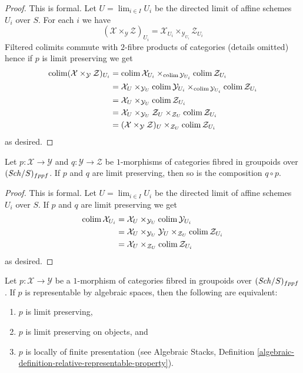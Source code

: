 \begin{proof}
This is formal. Let $U = \lim_{i \in I} U_i$ be the directed limit
of affine schemes $U_i$ over $S$. For each $i$ we have
$$
(\mathcal{X} \times_\mathcal{Y} \mathcal{Z})_{U_i} =
\mathcal{X}_{U_i} \times_{\mathcal{Y}_{U_i}} \mathcal{Z}_{U_i}
$$
Filtered colimits commute with $2$-fibre products of categories
(details omitted) hence if $p$ is limit preserving we get
\begin{align*}
\mathop{\mathrm{colim}}\nolimits (\mathcal{X} \times_\mathcal{Y} \mathcal{Z})_{U_i}
& =
\mathop{\mathrm{colim}}\nolimits \mathcal{X}_{U_i} \times_{\mathop{\mathrm{colim}}\nolimits \mathcal{Y}_{U_i}}
\mathop{\mathrm{colim}}\nolimits \mathcal{Z}_{U_i} \\
& =
\mathcal{X}_U \times_{\mathcal{Y}_U} \mathop{\mathrm{colim}}\nolimits \mathcal{Y}_{U_i}
\times_{\mathop{\mathrm{colim}}\nolimits \mathcal{Y}_{U_i}}
\mathop{\mathrm{colim}}\nolimits \mathcal{Z}_{U_i} \\
& =
\mathcal{X}_U \times_{\mathcal{Y}_U} \mathop{\mathrm{colim}}\nolimits \mathcal{Z}_{U_i} \\
& =
\mathcal{X}_U \times_{\mathcal{Y}_U} \mathcal{Z}_U \times_{\mathcal{Z}_U}
\mathop{\mathrm{colim}}\nolimits \mathcal{Z}_{U_i} \\
& =
(\mathcal{X} \times_\mathcal{Y} \mathcal{Z})_U \times_{\mathcal{Z}_U}
\mathop{\mathrm{colim}}\nolimits \mathcal{Z}_{U_i}
\end{align*}
as desired.
\end{proof}

\begin{lemma}
\label{lemma-composition-limit-preserving}
Let $p : \mathcal{X} \to \mathcal{Y}$ and $q : \mathcal{Y} \to \mathcal{Z}$
be $1$-morphisms of categories fibred in groupoids over $(\mathit{Sch}/S)_{fppf}$.
If $p$ and $q$ are limit preserving, then so is the composition $q \circ p$.
\end{lemma}

\begin{proof}
This is formal. Let $U = \lim_{i \in I} U_i$ be the directed limit
of affine schemes $U_i$ over $S$. If $p$ and $q$ are limit preserving we get
\begin{align*}
\mathop{\mathrm{colim}}\nolimits \mathcal{X}_{U_i}
& =
\mathcal{X}_U \times_{\mathcal{Y}_U} \mathop{\mathrm{colim}}\nolimits \mathcal{Y}_{U_i} \\
& =
\mathcal{X}_U \times_{\mathcal{Y}_U} \mathcal{Y}_U
\times_{\mathcal{Z}_U} \mathop{\mathrm{colim}}\nolimits \mathcal{Z}_{U_i} \\
& =
\mathcal{X}_U \times_{\mathcal{Z}_U} \mathop{\mathrm{colim}}\nolimits \mathcal{Z}_{U_i}
\end{align*}
as desired.
\end{proof}

\begin{lemma}
\label{lemma-representable-by-spaces-limit-preserving}
Let $p : \mathcal{X} \to \mathcal{Y}$ be a $1$-morphism of categories
fibred in groupoids over $(\mathit{Sch}/S)_{fppf}$. If $p$ is
representable by algebraic spaces, then the following are equivalent:
\begin{enumerate}
\item $p$ is limit preserving,
\item $p$ is limit preserving on objects, and
\item $p$ is locally of finite presentation (see
Algebraic Stacks,
Definition \ref{algebraic-definition-relative-representable-property}).
\end{enumerate}
\end{lemma}

